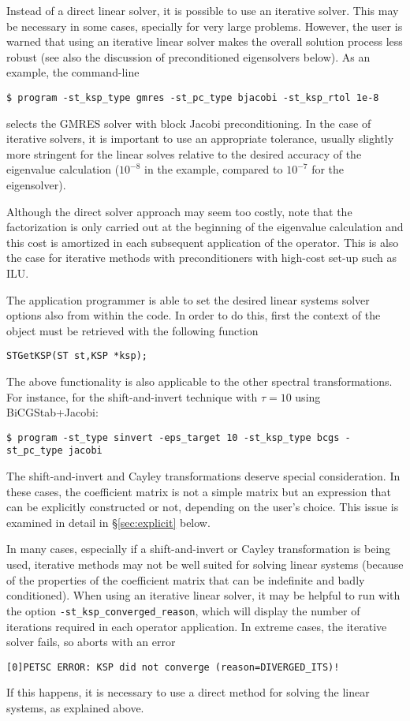 	Instead of a direct linear solver, it is possible to use an iterative solver. This may be necessary in some cases, specially for very large problems. However, the user is warned that using an iterative linear solver makes the overall solution process less robust (see also the discussion of preconditioned eigensolvers below). As an example, the command-line
\begin{Verbatim}[fontsize=\small]
	$ program -st_ksp_type gmres -st_pc_type bjacobi -st_ksp_rtol 1e-8
\end{Verbatim}
selects the GMRES solver with block Jacobi preconditioning. In the case of iterative solvers, it is important to use an appropriate tolerance, usually slightly more stringent for the linear solves relative to the desired accuracy of the eigenvalue calculation ($10^{-8}$ in the example, compared to $10^{-7}$ for the eigensolver). 

	Although the direct solver approach may seem too costly, note that the factorization is only carried out at the beginning of the eigenvalue calculation and this cost is amortized in each subsequent application of the operator. This is also the case for iterative methods with preconditioners with high-cost set-up such as ILU.

	The application programmer is able to set the desired linear systems solver options also from within the code. In order to do this, first the context of the  object must be retrieved with the following function
	\begin{Verbatim}[fontsize=\small]
	STGetKSP(ST st,KSP *ksp);
	\end{Verbatim}
	
	The above functionality is also applicable to the other spectral transformations. For instance, for the shift-and-invert technique with $\tau=10$ using BiCGStab+Jacobi:
\begin{Verbatim}[fontsize=\small]
	$ program -st_type sinvert -eps_target 10 -st_ksp_type bcgs -st_pc_type jacobi
\end{Verbatim}
	The shift-and-invert and Cayley transformations deserve special consideration. In these cases, the coefficient matrix is not a simple matrix but an expression that can be explicitly constructed or not, depending on the user's choice. This issue is examined in detail in \S\ref{sec:explicit} below.

In many cases, especially if a shift-and-invert or Cayley transformation is being used, iterative methods may not be well suited for solving linear systems (because of the properties of the coefficient matrix that can be indefinite and badly conditioned). When using an iterative linear solver, it may be helpful to run with the option \Verb!-st_ksp_converged_reason!, which will display the number of iterations required in each operator application.
In extreme cases, the iterative solver fails, so  aborts with an error
\begin{Verbatim}[fontsize=\small]
	[0]PETSC ERROR: KSP did not converge (reason=DIVERGED_ITS)!
\end{Verbatim}
If this happens, it is necessary to use a direct method for solving the linear systems, as explained above.

